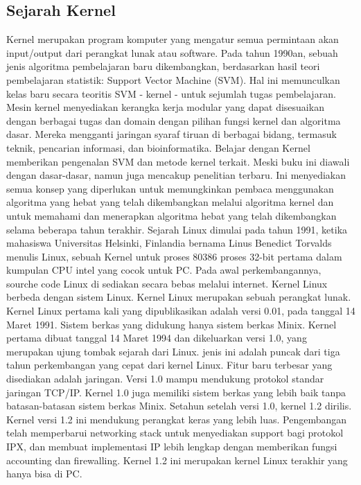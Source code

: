 		\subsection{Sejarah Kernel}
		 Kernel merupakan program komputer yang mengatur semua permintaan akan input/output dari perangkat lunak atau software.
		 Pada tahun 1990an, sebuah jenis algoritma pembelajaran baru dikembangkan, berdasarkan hasil teori pembelajaran statistik: Support Vector Machine (SVM). 
		 Hal ini memunculkan kelas baru secara teoritis SVM - kernel - untuk sejumlah tugas pembelajaran. 
		 Mesin kernel menyediakan kerangka kerja modular yang dapat disesuaikan dengan berbagai tugas dan domain dengan pilihan fungsi kernel dan algoritma dasar. 
		 Mereka mengganti jaringan syaraf tiruan di berbagai bidang, termasuk teknik, pencarian informasi, dan bioinformatika.
		 Belajar dengan Kernel memberikan pengenalan SVM dan metode kernel terkait. Meski buku ini diawali dengan dasar-dasar, namun juga mencakup penelitian terbaru. 
		 Ini menyediakan semua konsep yang diperlukan untuk memungkinkan pembaca menggunakan algoritma yang hebat yang telah dikembangkan melalui algoritma kernel dan untuk memahami dan menerapkan algoritma hebat yang telah dikembangkan selama beberapa tahun terakhir.
		 Sejarah Linux dimulai pada tahun 1991, ketika mahasiswa Universitas Helsinki, Finlandia bernama Linus Benedict Torvalds menulis Linux, sebuah Kernel untuk proses 80386
		 proses 32-bit pertama dalam kumpulan CPU intel yang cocok untuk PC.
		 Pada awal perkembangannya, sourche code Linux di sediakan secara bebas melalui internet. Kernel Linux berbeda dengan sistem Linux. Kernel Linux merupakan sebuah perangkat lunak.
		 Kernel Linux pertama kali yang dipublikasikan adalah versi 0.01, pada tanggal 14 Maret 1991. Sistem berkas yang didukung hanya sistem berkas Minix. Kernel pertama dibuat 
		 tanggal 14 Maret 1994 dan dikeluarkan versi 1.0, yang merupakan ujung tombak sejarah dari Linux. jenis ini adalah puncak dari tiga tahun perkembangan yang cepat dari kernel Linux. Fitur baru terbesar
		 yang disediakan adalah jaringan. Versi 1.0 mampu mendukung protokol standar jaringan TCP/IP. Kernel 1.0 juga memiliki sistem berkas yang lebih baik tanpa batasan-batasan sistem berkas Minix.
		 Setahun setelah versi 1.0, kernel 1.2 dirilis. Kernel versi 1.2 ini mendukung perangkat keras yang lebih luas. Pengembangan telah memperbarui networking stack untuk menyediakan
		 support bagi protokol IPX, dan membuat implementasi IP lebih lengkap dengan memberikan fungsi accounting dan firewalling. Kernel 1.2 ini merupakan kernel Linux terakhir yang hanya bisa di PC. 

